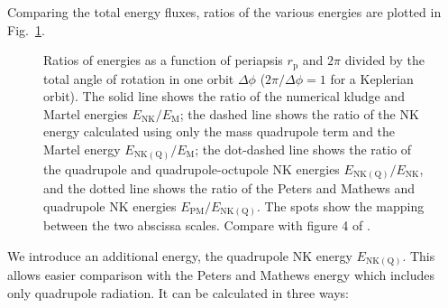 \documentclass[useAMS,usedcolumn,usegraphicx,usenatbib]{mn2e}
\newcommand{\figref}[1]{Fig.~\ref{fig:#1}}
\newcommand{\sub}[1]{\ensuremath{_\mathrm{#1}}}
\begin{document}
Comparing the total energy fluxes, ratios of the various energies are plotted in \figref{Energy_ratio}.
\begin{figure}
  \begin{center}
    \quad
    \caption{Ratios of energies as a function of periapsis $r\sub{p}$ and $2\pi$ divided by the total angle of rotation in one orbit $\Delta\phi$ ($2\pi/\Delta\phi = 1$ for a Keplerian orbit). The solid line shows the ratio of the numerical kludge and Martel energies $E\sub{NK}/E\sub{M}$; the dashed line shows the ratio of the NK energy calculated using only the mass quadrupole term and the Martel energy $E\sub{NK(Q)}/E\sub{M}$; the dot-dashed line shows the ratio of the quadrupole and quadrupole-octupole NK energies $E\sub{NK(Q)}/E\sub{NK}$, and the dotted line shows the ratio of the Peters and Mathews and quadrupole NK energies $E\sub{PM}/E\sub{NK(Q)}$. The spots show the mapping between the two abscissa scales. Compare with figure 4 of \citet{Gair2005}.\label{fig:Energy_ratio}}
  \end{center}
\end{figure}
We introduce an additional energy, the quadrupole NK energy $E\sub{NK(Q)}$. This allows easier comparison with the Peters and Mathews energy which includes only quadrupole radiation. It can be calculated in three ways:
\end{document}
